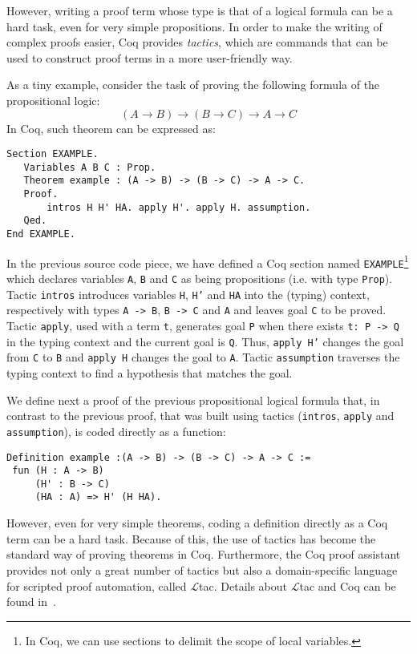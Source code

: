\documentclass[sigconf,anonymous]{acmart}
\begin{document}
However, writing a proof term whose type is that of a logical formula
can be a hard task, even for very simple propositions.  In order to
make the writing of complex proofs easier, Coq provides
\emph{tactics}, which are commands that can be used to construct proof
terms in a more user-friendly way.

As a tiny example, consider the task of proving the following 
formula of the propositional logic:
\[
(A \to B)\to (B\to C) \to A \to C
\]
In Coq, such theorem can be expressed as:
\begin{verbatim}
Section EXAMPLE.
   Variables A B C : Prop.
   Theorem example : (A -> B) -> (B -> C) -> A -> C.
   Proof.
       intros H H' HA. apply H'. apply H. assumption. 
   Qed.
End EXAMPLE.
\end{verbatim}
In the previous source code piece, we have defined a Coq section named
\texttt{EXAMPLE}\footnote{In Coq, we can use sections to delimit the
  scope of local variables.} which declares variables \texttt{A},
\texttt{B} and \texttt{C} as being propositions (i.e. with type
\texttt{Prop}). Tactic \texttt{intros} introduces variables
\texttt{H}, \texttt{H'} and \texttt{HA} into the (typing) context,
respectively with types \texttt{A -> B}, \texttt{B -> C} and
\texttt{A} and leaves goal \texttt{C} to be proved. Tactic
\texttt{apply}, used with a term \texttt{t}, generates goal
\texttt{P}
when there exists \texttt{t: P -> Q} in the typing context and the
current goal is \texttt{Q}. Thus, \texttt{apply H'} changes the goal
from \texttt{C} to \texttt{B} and \texttt{apply H}
changes the goal to \texttt{A}. Tactic \texttt{assumption}
traverses the typing context to find a hypothesis that matches the goal.

We define next a proof of the previous propositional logical formula
that, in contrast to the previous proof, that was built using tactics
(\texttt{intros}, \texttt{apply} and \texttt{assumption}), is coded
directly as a function:
\begin{verbatim}
Definition example :(A -> B) -> (B -> C) -> A -> C :=
 fun (H : A -> B)
     (H' : B -> C)
     (HA : A) => H' (H HA).
\end{verbatim}
However, even for very simple theorems, coding a definition directly
as a Coq term can be a hard task. Because of this, the use of tactics
has become the standard way of proving theorems in Coq. Furthermore,
the Coq proof assistant provides not only a great number of tactics
but also a domain-specific language for scripted proof automation,
called $\mathcal{L}$tac. Details about $\mathcal{L}$tac and Coq can be found
in~\cite{Chlipala13,Bertot10,manual_coq}.
\end{document}
